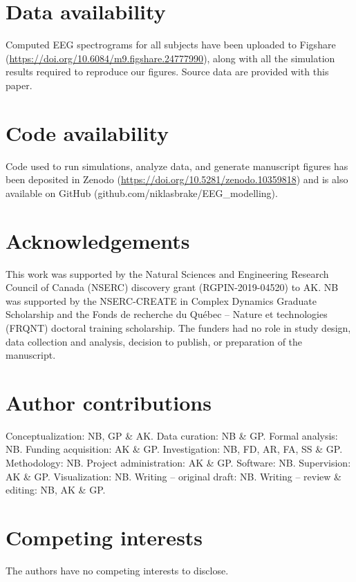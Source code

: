 \section{Data availability}
Computed EEG spectrograms for all subjects have been uploaded to Figshare\cite{Brake2023} (\url{https://doi.org/10.6084/m9.figshare.24777990}), along with all the simulation results required to reproduce our figures. Source data are provided with this paper.

\section{Code availability}
Code used to run simulations, analyze data, and generate manuscript figures\cite{niklas_brake_2023_10359818} has been deposited in Zenodo (\url{https://doi.org/10.5281/zenodo.10359818}) and is also available on GitHub (github.com/niklasbrake/EEG\_modelling).



\section{Acknowledgements}
This work was supported by the Natural Sciences and Engineering Research Council of Canada (NSERC) discovery grant (RGPIN-2019-04520) to AK. NB was supported by the NSERC-CREATE in Complex Dynamics Graduate Scholarship and the Fonds de recherche du Québec – Nature et technologies (FRQNT) doctoral training scholarship. The funders had no role in study design, data collection and analysis, decision to publish, or preparation of the manuscript. 

\section{Author contributions}
Conceptualization: NB, GP \& AK. Data curation: NB \& GP. Formal analysis: NB. Funding acquisition: AK \& GP. Investigation: NB, FD, AR, FA, SS \& GP. Methodology: NB. Project administration: AK \& GP. Software: NB. Supervision: AK \& GP. Visualization: NB. Writing – original draft: NB. Writing – review \& editing: NB, AK \& GP.

\section{Competing interests}
The authors have no competing interests to disclose.

\renewcommand{\thefigure}{\thechapter.\arabic{figure}}
\setcounter{figure}{0}